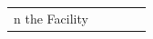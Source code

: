 \begin{table}[htb]
\begin{tabular}{lcccc}
n the Facility}                            
\end{tabular}
\end{table}
